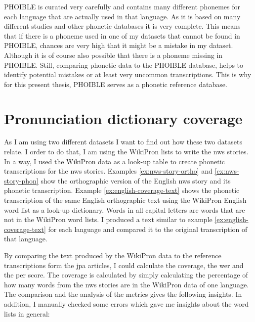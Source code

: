 PHOIBLE is curated very carefully and contains many different phonemes for each language that are actually used in that language. As it is based on many different studies and other phonetic databases it is very complete. This means that if there is a phoneme used in one of my datasets that cannot be found in PHOIBLE, chances are very high that it might be a mistake in my dataset. Although it is of course also possible that there is a phoneme missing in PHOIBLE. Still, comparing phonetic data to the PHOIBLE database, helps to identify potential mistakes or at least very uncommon transcriptions. This is why for this present thesis, PHOIBLE serves as a phonetic reference database. 

\section{Pronunciation dictionary coverage}
\label{sec:coverage}
As I am using two different datasets I want to find out how these two datasets relate. I order to do that, I am using the WikiPron lists to write the \ac{nws} stories. In a way, I used the WikiPron data as a look-up table to create phonetic transcriptions for the \ac{nws} stories. Examples \ref{ex:nws-story-ortho} and \ref{ex:nws-story-phon} show the orthographic version of the English \ac{nws} story and its phonetic transcription. Example \ref{ex:english-coverage-text} shows the phonetic transcription of the same English orthographic text using the WikiPron English word list as a look-up dictionary. Words in all capital letters are words that are not in the WikiPron word lists. I produced a text similar to example \ref{ex:english-coverage-text} for each language and compared it to the original transcription of that language.

\begin{covexamples}
\item \label{ex:english-coverage-text}
\end{covexamples}

By comparing the text produced by the WikiPron data to the reference transcriptions form the \ac{jpa} articles, I could calculate the coverage, the \ac{wer} and the \ac{per} score. The coverage is calculated by simply calculating the percentage of how many words from the \ac{nws} stories are in the WikiPron data of one language. The comparison and the analysis of the metrics gives the following insights. In addition, I manually checked some errors which gave me insights about the word lists in general:

